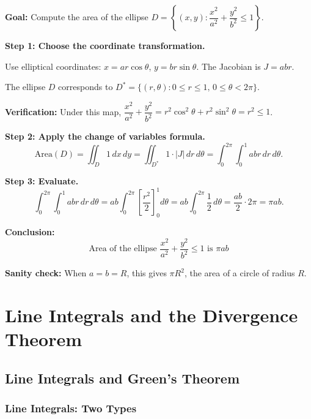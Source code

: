 \documentclass[11pt]{report}
\begin{document}
\begin{example}
\textbf{Goal:} Compute the area of the ellipse $D = \left\{ (x,y) : \dfrac{x^2}{a^2} + \dfrac{y^2}{b^2} \leq 1 \right\}$.

\textbf{Step 1: Choose the coordinate transformation.}

Use elliptical coordinates: $x = ar\cos\theta$, $y = br\sin\theta$. The Jacobian is $J = abr$.

The ellipse $D$ corresponds to $D^* = \{(r, \theta) : 0 \leq r \leq 1, \, 0 \leq \theta < 2\pi\}$.

\textbf{Verification:} Under this map, $\dfrac{x^2}{a^2} + \dfrac{y^2}{b^2} = r^2\cos^2\theta + r^2\sin^2\theta = r^2 \leq 1$. \checkmark

\textbf{Step 2: Apply the change of variables formula.}
\[
\text{Area}(D) = \iint_D 1 \, dx \, dy = \iint_{D^*} 1 \cdot |J| \, dr \, d\theta = \int_0^{2\pi} \int_0^1 abr \, dr \, d\theta.
\]

\textbf{Step 3: Evaluate.}
\[
\int_0^{2\pi} \int_0^1 abr \, dr \, d\theta = ab \int_0^{2\pi} \left[ \frac{r^2}{2} \right]_0^1 d\theta = ab \int_0^{2\pi} \frac{1}{2} \, d\theta = \frac{ab}{2} \cdot 2\pi = \pi ab.
\]

\textbf{Conclusion:}
\[
\boxed{\text{Area of the ellipse } \frac{x^2}{a^2} + \frac{y^2}{b^2} \leq 1 \text{ is } \pi ab}
\]

\textbf{Sanity check:} When $a = b = R$, this gives $\pi R^2$, the area of a circle of radius $R$. \checkmark
\end{example}

\chapter{Line Integrals and the Divergence Theorem}

\section{Line Integrals and Green's Theorem}

\subsection*{Line Integrals: Two Types}
\end{document}
